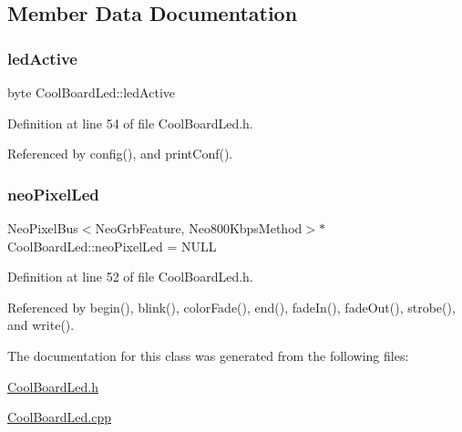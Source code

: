 \subsection{Member Data Documentation}
\mbox{\label{classCoolBoardLed_a5f17c135516fcf4b44ea8a096ba0177a}} 
\subsubsection{\texorpdfstring{led\+Active}{ledActive}}
{\footnotesize\ttfamily byte Cool\+Board\+Led\+::led\+Active\hspace{0.3cm}{\ttfamily [private]}}



Definition at line 54 of file Cool\+Board\+Led.\+h.



Referenced by config(), and print\+Conf().

\mbox{\label{classCoolBoardLed_ac2c13fa462a010cd9242bf297c013923}} 
\subsubsection{\texorpdfstring{neo\+Pixel\+Led}{neoPixelLed}}
{\footnotesize\ttfamily Neo\+Pixel\+Bus$<$Neo\+Grb\+Feature, Neo800\+Kbps\+Method$>$$\ast$ Cool\+Board\+Led\+::neo\+Pixel\+Led = N\+U\+LL\hspace{0.3cm}{\ttfamily [private]}}



Definition at line 52 of file Cool\+Board\+Led.\+h.



Referenced by begin(), blink(), color\+Fade(), end(), fade\+In(), fade\+Out(), strobe(), and write().



The documentation for this class was generated from the following files\+:\begin{DoxyCompactItemize}
\item 
\hyperlink{CoolBoardLed_8h}{Cool\+Board\+Led.\+h}\item 
\hyperlink{CoolBoardLed_8cpp}{Cool\+Board\+Led.\+cpp}\end{DoxyCompactItemize}
